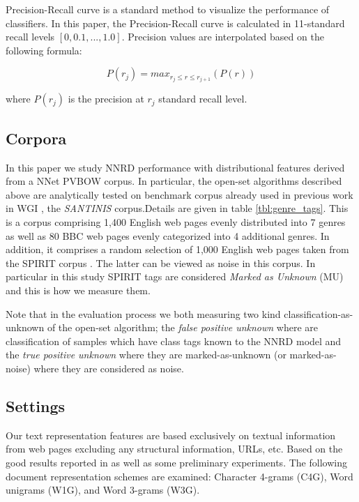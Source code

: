 Precision-Recall curve is a standard method to visualize the performance of classifiers. In this paper, the Precision-Recall curve is calculated in 11-standard recall levels $[0,0.1,...,1.0]$. Precision values are interpolated based on the following formula:

\begin{equation}
	P(r_j)=max_{r_j \leqslant r \leqslant r_{j+1}}(P(r))
\end{equation}

\noindent
where $P(r_j)$ is the precision at $r_j$ standard recall level.

\subsection{Corpora}\label{chap:word_embedding:sec:corpora}
In this paper we study NNRD performance with distributional features derived from a NNet PVBOW corpus. In particular, the open-set algorithms described above are analytically tested on benchmark corpus already used in previous work in WGI \citep{meyer2004genre,santini2007automatic,kanaris2009learning,pritsos2018open}, the \textit{SANTINIS} \cite{mehler2010genres_on_web} corpus.Details are given in table \ref{tbl:genre_tags}. This is a corpus comprising 1,400 English web pages evenly distributed into 7 genres as well as 80 BBC web pages evenly categorized into 4 additional genres. In addition, it comprises a random selection of 1,000 English web pages taken from the SPIRIT corpus \cite{joho2004spirit}. The latter can be viewed as noise in this corpus. In particular in this study SPIRIT tags are considered \textit{Marked as Unknown} (MU) and this is how we measure them.

Note that in the evaluation process we both measuring two kind classification-as-unknown of the open-set algorithm; the \textit{false positive unknown} where are classification of samples which have class tags known to the NNRD model and the \textit{true positive unknown} where they are marked-as-unknown (or marked-as-noise) where they are considered as noise.

\subsection{Settings}\label{chap:word_embedding:sec:evaluation_measures}
Our text representation features are based exclusively on textual information from web pages excluding any structural information, URLs, etc. Based on the good results reported in \citep{sharoff2010web,pritsos2013open,Asheghi2015} as well as some preliminary experiments. The following document representation schemes are examined: Character 4-grams (C4G), Word unigrams (W1G), and Word 3-grams (W3G).

